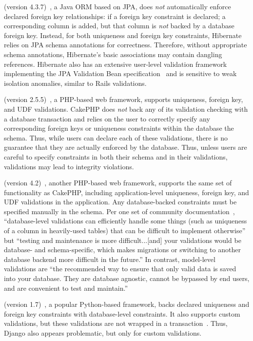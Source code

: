  (version 4.3.7)~\cite{code-hibernate}, a Java ORM
based on JPA, does \textit{not} automatically enforce declared foreign
key relationships: if a foreign key constraint is declared; a
corresponding column is added, but that column is \textit{not} backed by a
database foreign key. Instead, for both uniqueness and foreign key
constraints, Hibernate relies on JPA schema annotations for
correctness. Therefore, without appropriate schema annotations,
Hibernate's basic associations may contain dangling references. Hibernate also has an extensive user-level validation
framework implementing the JPA Validation Bean
specification~\cite{code-hibernate-validator} and is sensitive to weak
isolation anomalies, similar to Rails validations.

 (version 2.5.5)~\cite{code-cakephp}, a PHP-based web
framework, supports uniqueness, foreign key, and UDF
validations. CakePHP does \textit{not} back any of its validation
checking with a database transaction and relies on the user to
correctly specify any corresponding foreign keys or uniqueness
constraints within the database the schema. Thus, while users can
declare each of these validations, there is no guarantee that they are
actually enforced by the database. Thus, unless users are careful to
specify constraints in both their schema and in their validations,
validations may lead to integrity violations.

 (version 4.2)~\cite{code-laravel}, another PHP-based web
framework, supports the same set of functionality as CakePHP,
including application-level uniqueness, foreign key, and UDF
validations in the application. Any database-backed constraints must
be specified manually in the schema. Per one set of community
documentation~\cite{laravel-book}, ``database-level validations can
efficiently handle some things (such as uniqueness of a column in
heavily-used tables) that can be difficult to implement otherwise''
but ``testing and maintenance is more difficult...[and] your
validations would be database- and schema-specific, which makes
migrations or switching to another database backend more difficult in
the future.'' In contrast, model-level validations are ``the
recommended way to ensure that only valid data is saved into your
database. They are database agnostic, cannot be bypassed by end users,
and are convenient to test and maintain.'' 

 (version 1.7)~\cite{code-django}, a popular Python-based
framework, backs declared uniqueness and foreign key constraints with
database-level constraints. It also supports custom validations, but
these validations are not wrapped in a
transaction~\cite{code-django-constraints}. Thus, Django also appears
problematic, but only for custom validations.

